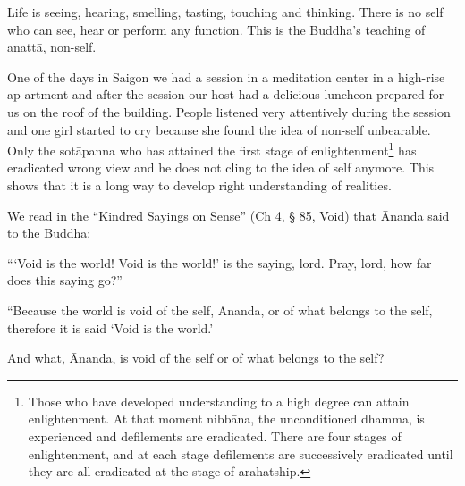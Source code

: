 Life is seeing, hearing, smelling,
tasting, touching and thinking. There is no self who can see, hear or
perform any function. This is the Buddha's teaching of anattā,
non-self.

One of the days in Saigon we had a
session in a meditation center in a high-rise ap-artment and after the
session our host had a delicious luncheon prepared for us on the roof of
the building. People listened very attentively during the session and
one girl started to cry because she found the idea of non-self
unbearable. Only the sotāpanna who has attained the first stage of
enlightenment\footnote{Those who have developed
understanding to a high degree can attain enlightenment. At that moment
nibbāna, the unconditioned dhamma, is experienced and defilements are
eradicated. There are four stages of enlightenment, and at each stage
defilements are successively eradicated until they are all eradicated at
the stage of arahatship.}
has eradicated wrong view and he does not cling to the idea of self
anymore. This shows that it is a long way to develop right understanding
of realities. 

We read in the ``Kindred Sayings on
Sense'' (Ch 4, § 85, Void) that Ānanda said to the Buddha:

```Void is the world! Void is the
world!' is the saying, lord. Pray, lord, how far does this saying go?''

``Because the world is void of the
self, Ānanda, or of what belongs to the self, therefore it is said `Void
is the world.'

And what, Ānanda, is void of the self
or of what belongs to the self?

